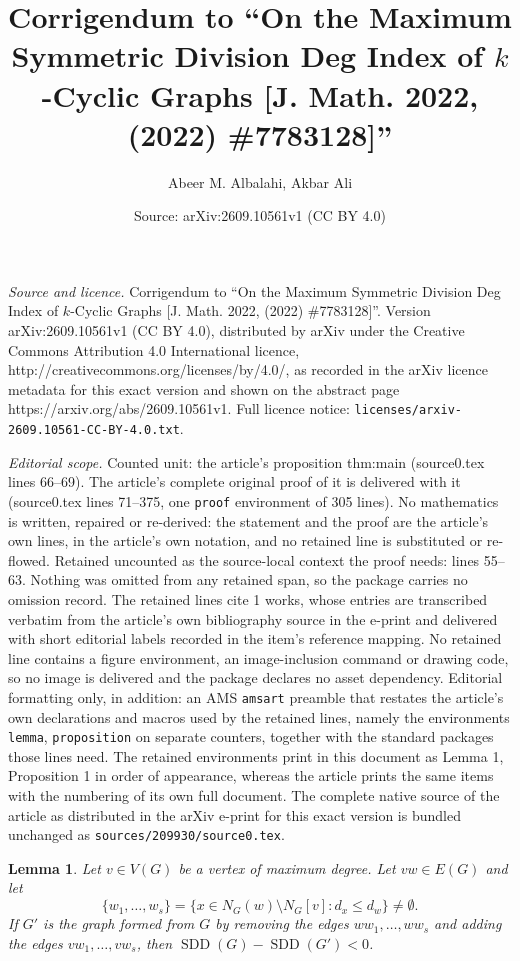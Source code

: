 \documentclass[10pt,a4paper]{amsart}
\title{Corrigendum to ``On the Maximum Symmetric Division Deg Index of $k$-Cyclic Graphs [J. Math. 2022, (2022) \#7783128]''}
\author{Abeer M. Albalahi, Akbar Ali}
\date{Source: arXiv:2609.10561v1 (CC BY 4.0)}
\newtheorem{lemma}{Lemma}
\newcommand{\SDD}{\operatorname{SDD}}
\begin{document}
\maketitle

\noindent\emph{Source and licence.} Corrigendum to ``On the Maximum Symmetric Division Deg Index of $k$-Cyclic Graphs [J. Math. 2022, (2022) \#7783128]''. Version arXiv:2609.10561v1 (CC BY 4.0), distributed by arXiv under the Creative Commons Attribution 4.0 International licence, http://creativecommons.org/licenses/by/4.0/, as recorded in the arXiv licence metadata for this exact version and shown on the abstract page https://arxiv.org/abs/2609.10561v1. Full licence notice: \texttt{licenses/arxiv-2609.10561-CC-BY-4.0.txt}.\par\smallskip

\noindent\textit{Editorial scope.} Counted unit: the article's proposition thm:main (source0.tex lines 66--69). The article's complete original proof of it is delivered with it (source0.tex lines 71--375, one \texttt{proof} environment of 305 lines). No mathematics is written, repaired or re-derived: the statement and the proof are the article's own lines, in the article's own notation, and no retained line is substituted or re-flowed.  Retained uncounted as the source-local context the proof needs: lines 55--63.  Nothing was omitted from any retained span, so the package carries no omission record.  The retained lines cite 1 works, whose entries are transcribed verbatim from the article's own bibliography source in the e-print and delivered with short editorial labels recorded in the item's reference mapping.  No retained line contains a figure environment, an image-inclusion command or drawing code, so no image is delivered and the package declares no asset dependency.  Editorial formatting only, in addition: an AMS \texttt{amsart} preamble that restates the article's own declarations and macros used by the retained lines, namely the environments \texttt{lemma}, \texttt{proposition} on separate counters, together with the standard packages those lines need.  The retained environments print in this document as Lemma 1, Proposition 1 in order of appearance, whereas the article prints the same items with the numbering of its own full document.  The complete native source of the article as distributed in the arXiv e-print for this exact version is bundled unchanged as \texttt{sources/209930/source0.tex}.
\begin{lemma}\label{lem:transfer}
Let $v\in V(G)$ be a vertex of maximum degree. Let $vw\in E(G)$ and let
\[
\{w_1,\ldots,w_s\}
=\{x\in N_G(w)\setminus N_G[v]:d_x\le d_w\}\ne\emptyset.
\]
If $G'$ is the graph formed from $G$ by removing the edges $ww_1,\ldots,ww_s$ and adding the edges $vw_1,\ldots,vw_s$,
then $\SDD(G)-\SDD(G')<0$.
\end{lemma}
\end{document}
